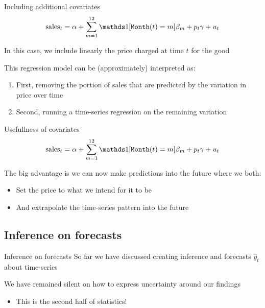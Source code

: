 \documentclass[aspectratio=169,t,11pt,table]{beamer}
\begin{document}
\begin{frame}{Including additional covariates}
  \vspace*{-\bigskipamount}
  $$
    \text{sales}_t = \alpha + \sum_{m = 1}^{12} \one{\texttt{Month}(t) = m} \beta_m + p_t \gamma + u_t
  $$

  In this case, we include linearly the price charged at time $t$ for the good

  \pause
  \bigskip
  This regression model can be (approximately) interpreted as:
  \begin{enumerate}
    \item First, removing the portion of sales that are predicted by the variation in price over time
    
    \item Second, running a time-series regression on the remaining variation
  \end{enumerate}
\end{frame}

\begin{frame}{Usefullness of covariates}
  \vspace*{-\bigskipamount}
  $$
    \text{sales}_t = \alpha + \sum_{m = 1}^{12} \one{\texttt{Month}(t) = m} \beta_m + p_t \gamma + u_t
  $$

  The big advantage is we can now make predictions into the future where we both:
  \begin{itemize}
    \item Set the price to what we intend for it to be
    \item And extrapolate the time-series pattern into the future
  \end{itemize}  
\end{frame}


\subsection{Inference on forecasts}

\begin{frame}{Inference on forecasts}
  So far we have discussed creating inference and forecasts $\hat{y}_t$ about time-series

  \bigskip
  We have remained silent on how to express uncertainty around our findings
  \begin{itemize}
    \item This is the second half of statistics!
  \end{itemize}
\end{frame}
\end{document}
